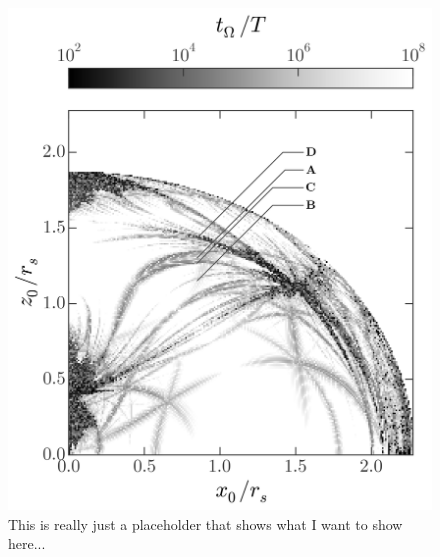 \documentclass[letterpaper,12pt,preprint]{aastex}
\begin{document}
\begin{figure}[p]
\begin{center}
\includegraphics[width=\textwidth]{figures/fdiff_map.png}
\caption{This is really just a placeholder that shows what I want to show here...} \label{fig:freqdiff}
\end{center}
\end{figure}
\end{document}
